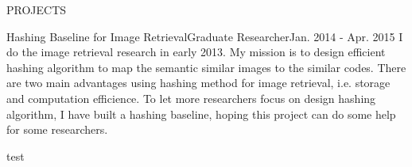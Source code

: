 \documentclass{resume} %
\begin{document}
\begin{rSection}{PROJECTS}

\begin{pSubsection}{Hashing Baseline for Image Retrieval}{Graduate Researcher}{Jan. 2014 - Apr. 2015}
{I do the image retrieval research in early 2013. My mission is to design efficient hashing algorithm to map the semantic similar images to the similar codes. There are two main advantages using hashing method for image retrieval, i.e. storage and computation efficience. To let more researchers focus on design hashing algorithm, I have built a hashing baseline, hoping this project can do some help for some researchers.}
\item test
\end{pSubsection}
\end{rSection}


\end{document}
